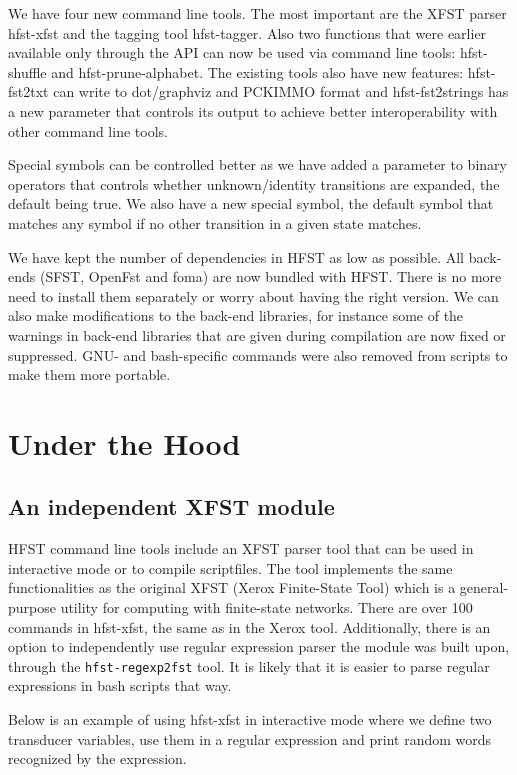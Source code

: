 \documentclass{llncs}
\begin{document}
We have four new command line tools. The most important are the XFST
parser hfst-xfst and the tagging tool hfst-tagger. Also two functions
that were earlier available only through the API can now be used via
command line tools: hfst-shuffle and hfst-prune-alphabet. The existing
tools also have new features: hfst-fst2txt can write to dot/graphviz
and PCKIMMO format and hfst-fst2strings has a new parameter that
controls its output to achieve better interoperability with other
command line tools.

Special symbols can be controlled better as we have added a parameter
to binary operators that controls whether unknown/identity transitions
are expanded, the default being true. We also have a new special
symbol, the default symbol that matches any symbol if no other
transition in a given state matches.

We have kept the number of dependencies in HFST as low as possible.
All back-ends (SFST, OpenFst and foma) are now bundled with
HFST. There is no more need to install them separately or worry about
having the right version. We can also make modifications to the
back-end libraries, for instance some of the warnings in back-end
libraries that are given during compilation are now fixed or
suppressed. GNU- and bash-specific commands were also removed from
scripts to make them more portable.

\section{Under the Hood}

\subsection{An independent XFST module}

HFST command line tools include an XFST parser tool that can be used
in interactive mode or to compile scriptfiles. The tool implements the
same functionalities as the original XFST (Xerox Finite-State Tool)
which is a general-purpose utility for computing with finite-state
networks. There are over 100 commands in hfst-xfst, the same as in the
Xerox tool. Additionally, there is an option to independently use
regular expression parser the module was built upon, through the
\verb+hfst-regexp2fst+ tool. It is likely that it is easier to parse
regular expressions in bash scripts that way.

Below is an example of using hfst-xfst in interactive
mode where we define two transducer variables, use them in a regular
expression and print random words recognized by the expression.
\end{document}
